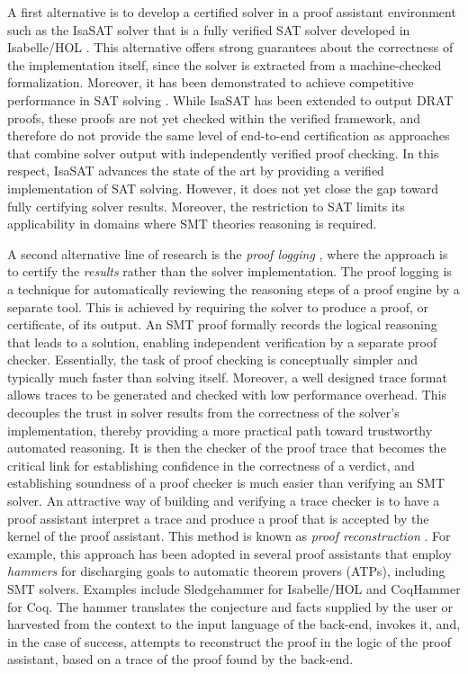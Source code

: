 A first alternative is to develop a certified solver in a proof assistant environment such as the IsaSAT solver \cite{fleury:tel-02963301,fleury:hal-01904647} that is a fully verified SAT solver developed in Isabelle/HOL \cite{isabelle-hol-ref}.
This alternative offers strong guarantees about the correctness of the implementation itself, since the solver is extracted from a machine-checked formalization.
Moreover, it has been demonstrated to achieve competitive performance in SAT solving \cite{EDA-challenge}.
While IsaSAT has been extended to output DRAT proofs, these proofs are not yet checked within the verified framework, and therefore do not provide the same level of end-to-end certification as approaches that combine solver output with independently verified proof checking.
In this respect, IsaSAT advances the state of the art by providing a verified implementation of SAT solving.
However, it does not yet close the gap toward fully certifying solver results.
Moreover, the restriction to SAT limits its applicability in domains where SMT theories reasoning is required.


A second alternative line of research is the \emph{proof logging} \cite{proof-logging}, where the approach is to certify the \emph{results} rather than the solver implementation.
The proof logging is a technique for automatically reviewing the reasoning steps of a proof engine by a separate tool.
This is achieved by requiring the solver to produce a proof, or certificate, of its output.
An SMT proof formally records the logical reasoning that leads to a solution, enabling independent verification by a separate proof checker.
Essentially, the task of proof checking is conceptually simpler and typically much faster than solving itself.
Moreover, a well designed trace format allows traces to be generated and checked with low performance overhead.
This decouples the trust in solver results from the correctness of the solver’s implementation, thereby providing a more practical path toward trustworthy automated reasoning.
It is then the checker of the proof trace that becomes the critical link for establishing confidence in the correctness of a verdict, and establishing soundness of a proof checker is much easier than verifying an SMT solver.
An attractive way of building and verifying a trace checker is to have a proof assistant interpret a trace and produce a proof that is accepted by the kernel of the proof assistant.
This method is known as \emph{proof reconstruction} \cite{z3recon}.
For example, this approach has been adopted in several proof assistants that employ \emph{hammers} for discharging goals to automatic theorem provers (ATPs), including SMT solvers.
Examples include Sledgehammer \cite{Sledgehammer} for Isabelle/HOL and CoqHammer \cite{coqhammer1,coqhammer2} for Coq.
The hammer translates the conjecture and facts supplied by the user or harvested from the context to the input language of the back-end, invokes it, and, in the case of success, attempts to reconstruct the proof in the logic of the proof assistant, based on a trace of the proof found by the back-end.


